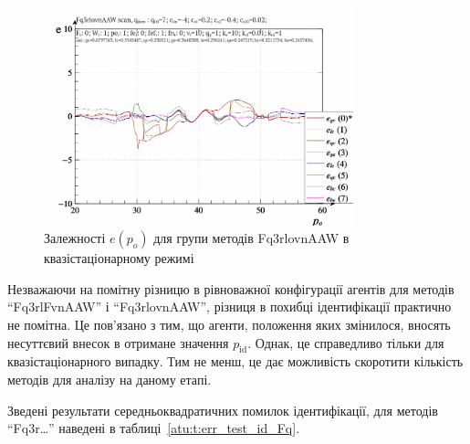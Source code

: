 \begin{figure}[htb!]
  \begin{center}
    \includegraphics[width=0.8\textwidth]{p/scan/qls-p_p_e_Fq3rlovnAAW_scan.png}
  \end{center}
  \caption{Залежності $e(p_o)$ для групи методів Fq3rlovnAAW в квазістаціонарному режимі}
  \label{atu:f:Fq3rlovnAAW_scan}
\end{figure}

Незважаючи на помітну різницю в рівноважної конфігурації
агентів для методів ``Fq3rlFvnAAW'' і ``Fq3rlovnAAW'', різниця в похибці
ідентифікації практично не помітна. Це пов'язано з тим, що агенти,
положення яких змінилося, вносять несуттєвий внесок в отримане
значення
$p_\mathrm{id}$. Однак, це справедливо тільки для квазістаціонарного
випадку. Тим не менш, це дає можливість скоротити кількість
методів для аналізу на даному етапі.

Зведені результати середньоквадратичних помилок ідентифікації,
для методів ``Fq3r\ldots'' наведені в таблиці~\ref{atu:t:err_test_id_Fq}.

